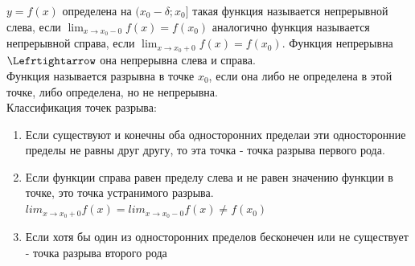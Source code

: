 \documentclass[oneside]{book}
\begin{document}
\begin{enumerate}
$y = f(x)$ определена на $(x_0 - \delta; x_0]$ такая функция называется непрерывной слева, если $\lim_{x \rightarrow x_0 - 0}{f(x)} = f(x_0)$
аналогично функция называется непрерывной справа, если $\lim_{x \rightarrow x_0 + 0}{f(x)} = f(x_0)$. Функция непрерывна $\Lefrtightarrow$ она непрерывна слева и справа. \\
Функция называется разрывна в точке $x_0$, если она либо не определена в этой точке, либо определена, но не непрерывна. \\
Классификация точек разрыва:
\begin{enumerate}
    \item Если существуют и конечны оба односторонних пределаи эти односторонние пределы не равны друг другу, то эта точка - точка разрыва
          первого рода.
    \item Если функции справа равен пределу слева и не равен значению функции в точке, это точка устранимого разрыва.
          $lim_{x \rightarrow x_0+0}{f(x)} = lim_{x \rightarrow x_0-0}{f(x)} \neq f(x_0)$
    \item Если хотя бы один из односторонних пределов бесконечен или не существует - точка разрыва второго рода
\end{enumerate}


\end{enumerate}
\end{document}
